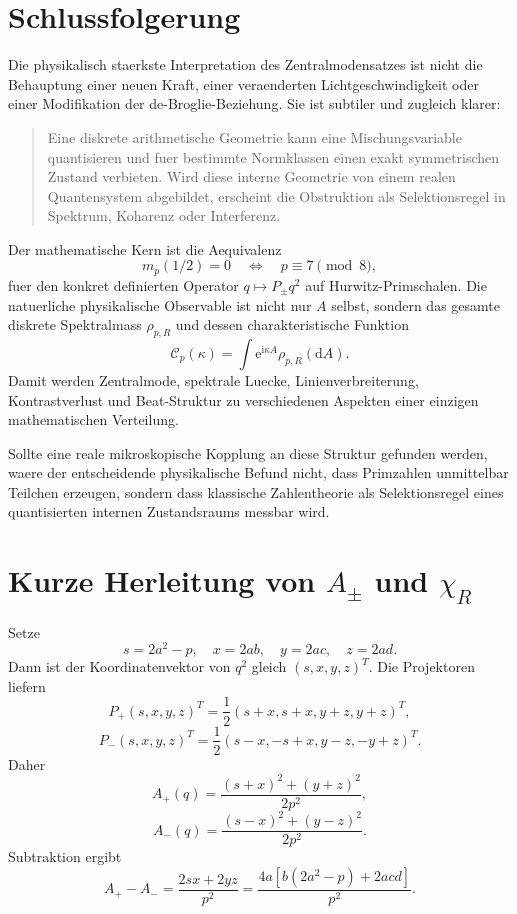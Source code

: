 \documentclass[11pt,a4paper]{article}
\theoremstyle{definition}
\newcommand{\dd}{\mathrm d}
\newcommand{\ii}{\mathrm i}
\newcommand{\e}{\mathrm e}
\begin{document}
\section{Schlussfolgerung}
Die physikalisch staerkste Interpretation des Zentralmodensatzes ist nicht die Behauptung einer neuen Kraft, einer veraenderten Lichtgeschwindigkeit oder einer Modifikation der de-Broglie-Beziehung. Sie ist subtiler und zugleich klarer:
\begin{quote}
Eine diskrete arithmetische Geometrie kann eine Mischungsvariable quantisieren und fuer bestimmte Normklassen einen exakt symmetrischen Zustand verbieten. Wird diese interne Geometrie von einem realen Quantensystem abgebildet, erscheint die Obstruktion als Selektionsregel in Spektrum, Koharenz oder Interferenz.
\end{quote}

Der mathematische Kern ist die Aequivalenz
\[
\boxed{
m_p(1/2)=0
\quad\Longleftrightarrow\quad
p\equiv7\pmod8,
}
\]
fuer den konkret definierten Operator $q\mapsto P_\pm q^2$ auf Hurwitz-Primschalen. Die natuerliche physikalische Observable ist nicht nur $A$ selbst, sondern das gesamte diskrete Spektralmass $\rho_{p,R}$ und dessen charakteristische Funktion
\[
\boxed{
\mathcal C_p(\kappa)
=\int\e^{\ii\kappa A}\rho_{p,R}(\dd A).
}
\]
Damit werden Zentralmode, spektrale Luecke, Linienverbreiterung, Kontrastverlust und Beat-Struktur zu verschiedenen Aspekten einer einzigen mathematischen Verteilung.

Sollte eine reale mikroskopische Kopplung an diese Struktur gefunden werden, waere der entscheidende physikalische Befund nicht, dass Primzahlen unmittelbar Teilchen erzeugen, sondern dass klassische Zahlentheorie als Selektionsregel eines quantisierten internen Zustandsraums messbar wird.

\appendix
\section{Kurze Herleitung von $A_\pm$ und $\chi_R$}
Setze
\[
s=2a^2-p,\quad x=2ab,\quad y=2ac,\quad z=2ad.
\]
Dann ist der Koordinatenvektor von $q^2$ gleich $(s,x,y,z)^T$. Die Projektoren liefern
\[
P_+(s,x,y,z)^T
=\frac12(s+x,s+x,y+z,y+z)^T,
\]
\[
P_-(s,x,y,z)^T
=\frac12(s-x,-s+x,y-z,-y+z)^T.
\]
Daher
\[
A_+(q)=\frac{(s+x)^2+(y+z)^2}{2p^2},
\]
\[
A_-(q)=\frac{(s-x)^2+(y-z)^2}{2p^2}.
\]
Subtraktion ergibt
\[
A_+-A_-
=\frac{2sx+2yz}{p^2}
=\frac{4a[b(2a^2-p)+2acd]}{p^2}.
\]
\end{document}
